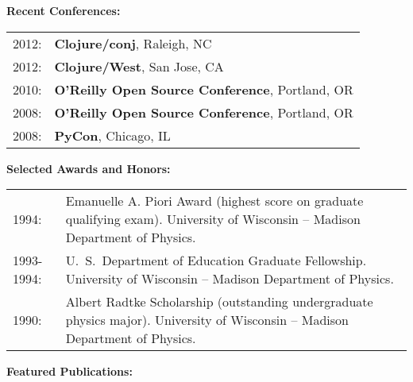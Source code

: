 {\bf Recent Conferences:}
\vspace{0.25cm}

\begin{tabular}[t]{lp{}}

2012: & {\bf Clojure/conj}, Raleigh, NC\\
2012: & {\bf Clojure/West}, San Jose, CA\\
2010: & {\bf O'Reilly Open Source Conference}, Portland, OR\\
2008: & {\bf O'Reilly Open Source Conference}, Portland, OR\\
2008: & {\bf PyCon}, Chicago, IL\\
\end{tabular}

\newpage

{\bf Selected Awards and Honors:}
\vspace{0.25cm}

\begin{tabular}[t]{lp{}}

1994: & Emanuelle A. Piori Award (highest score on graduate qualifying exam).
University of Wisconsin -- Madison Department of Physics.\\[0.25cm]

1993-1994: & U.~S.~Department of Education Graduate Fellowship.  
University of Wisconsin -- Madison Department of Physics.\\[0.25cm]

1990: & Albert Radtke Scholarship (outstanding undergraduate physics major).
University of Wisconsin -- Madison Department of Physics.\\[0.25cm]

\end{tabular}

{\bf Featured Publications:}

